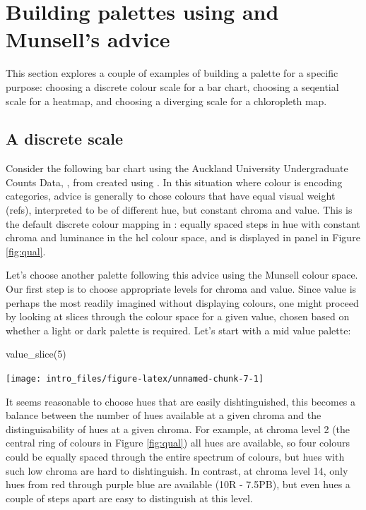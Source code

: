 \section{\texorpdfstring{Building palettes using  and
Munsell's
advice}{Building palettes using  and Munsell's advice}}\label{building-palettes-using-and-munsells-advice}

This section explores a couple of examples of building a palette for a
specific purpose: choosing a discrete colour scale for a bar chart,
choosing a seqential scale for a heatmap, and choosing a diverging scale
for a chloropleth map.

\subsection{A discrete scale}\label{a-discrete-scale}

Consider the following bar chart using the Auckland University
Undergraduate Counts Data, , from  created
using . In this situation where colour is encoding
categories, advice is generally to chose colours that have equal visual
weight (refs), interpreted to be of different hue, but constant chroma
and value. This is the default discrete colour mapping in
: equally spaced steps in hue with constant chroma and
luminance in the hcl colour space, and is displayed in panel in Figure
\ref{fig:qual}.

Let's choose another palette following this advice using the Munsell
colour space. Our first step is to choose appropriate levels for chroma
and value. Since value is perhaps the most readily imagined without
displaying colours, one might proceed by looking at slices through the
colour space for a given value, chosen based on whether a light or dark
palette is required. Let's start with a mid value palette:

\begin{Schunk}
\begin{Sinput}
value_slice(5) 
\end{Sinput}

\texttt{[image: intro\_files/figure-latex/unnamed-chunk-7-1]} \end{Schunk}

It seems reasonable to choose hues that are easily dishtinguished, this
becomes a balance between the number of hues available at a given chroma
and the distinguisability of hues at a given chroma. For example, at
chroma level 2 (the central ring of colours in Figure \ref{fig:qual})
all hues are available, so four colours could be equally spaced through
the entire spectrum of colours, but hues with such low chroma are hard
to dishtinguish. In contrast, at chroma level 14, only hues from red
through purple blue are available (10R - 7.5PB), but even hues a couple
of steps apart are easy to distinguish at this level.

